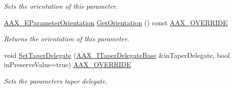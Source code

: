 \begin{Indent}
\begin{DoxyCompactItemize}
\begin{DoxyCompactList}\small\item\em Sets the orientation of this parameter. \end{DoxyCompactList}\item 
\mbox{\hyperlink{a00491_a52f91d1c14aa5dceedabfb9d2de31bf0}{A\+A\+X\+\_\+\+E\+Parameter\+Orientation}} \mbox{\hyperlink{a01537_a892d8a5a49ead3b3f922831a46744899}{Get\+Orientation}} () const \mbox{\hyperlink{a00392_ac2f24a5172689ae684344abdcce55463}{A\+A\+X\+\_\+\+O\+V\+E\+R\+R\+I\+DE}}
\begin{DoxyCompactList}\small\item\em Returns the orientation of this parameter. \end{DoxyCompactList}\item 
void \mbox{\hyperlink{a01537_a73951bf97667382f01103a9230ce0c3e}{Set\+Taper\+Delegate}} (\mbox{\hyperlink{a01877}{A\+A\+X\+\_\+\+I\+Taper\+Delegate\+Base}} \&in\+Taper\+Delegate, bool in\+Preserve\+Value=true) \mbox{\hyperlink{a00392_ac2f24a5172689ae684344abdcce55463}{A\+A\+X\+\_\+\+O\+V\+E\+R\+R\+I\+DE}}
\begin{DoxyCompactList}\small\item\em Sets the parameter\textquotesingle{}s taper delegate. \end{DoxyCompactList}\end{DoxyCompactItemize}
\end{Indent}
